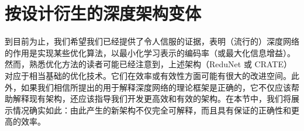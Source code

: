\documentclass[../../book-main.tex]{subfiles}
\begin{document}
\begin{table}[t!]
\centering
\caption{\small \textsc{crate} 在不同模型规模下，在 ImageNet-1K 上预训练后，在各种数据集上的 Top-1 分类准确率。对于 ImageNet-1K/ImageNet-1K ReaL，我们直接评估 top-1 准确率。对于其他数据集，我们使用在 ImageNet 上预训练的模型作为初始化，并通过微调评估迁移学习性能。}
\label{tab:crate_comparison_with_sota}
\small
    \setlength{\tabcolsep}{13.6pt}
\end{table}



\section{按设计衍生的深度架构变体} \label{sec:chap4-derive-white-box-transformer-variants}

到目前为止，我们希望我们已经提供了令人信服的证据，表明（流行的）深度网络的作用是实现某些优化算法，以最小化学习表示的编码率（或最大化信息增益）。然而，熟悉优化方法的读者可能已经注意到，上述架构（ReduNet 或 CRATE）对应于相当基础的优化技术。它们在效率或有效性方面可能有很大的改进空间。此外，如果我们相信所提出的用于解释深度网络的理论框架是正确的，它不仅应该帮助解释现有架构，还应该指导我们开发更高效和有效的架构。在本节中，我们将展示情况确实如此：由此产生的新架构不仅完全可解释，而且具有保证的正确性和更高的效率。
\end{document}
